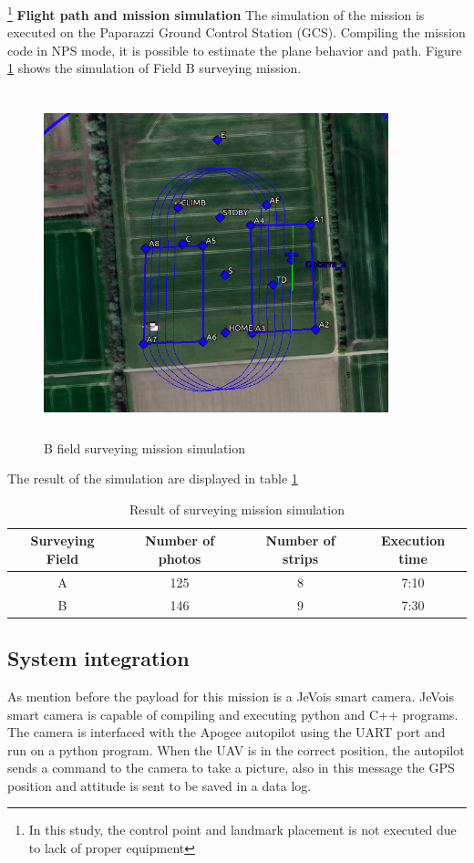 \footnote{In this study, the control point and landmark placement is not executed due to lack of proper equipment} 
\textbf{Flight path and mission simulation}\newline
The simulation of the mission is executed on the Paparazzi Ground Control Station (GCS). Compiling the mission code in NPS mode, it is possible to estimate the plane behavior and path. Figure \ref{fig:bsim} shows the simulation of Field B surveying mission.
\begin{figure}[H]
\centering
\includegraphics[width=10cm,height=10cm,keepaspectratio]{imagenes/SimBField.png}
\caption{B field surveying mission simulation}
\label{fig:bsim}
\end{figure}
The result of the simulation are displayed in table \ref{Table:SimResult}
\begin{table}[H]
\centering
\begin{tabular}{|c|c|c|c|}
\hline
Surveying Field & Number of photos & Number of strips & Execution time \\ \hline
A               & 125              & 8                & 7:10           \\ \hline
B               & 146              & 9                & 7:30           \\ \hline
\end{tabular}
\caption{Result of surveying mission simulation}
\label{Table:SimResult}
\end{table}
\subsection{System integration}
As mention before the payload for this mission is a JeVois smart camera. JeVois smart camera is capable of compiling and executing python and C++ programs. The camera is interfaced with the Apogee autopilot using the UART port and run on a python program.
 When the UAV is in the correct position, the autopilot sends a command to the camera to take a picture, also in this message the GPS position and attitude is sent to be saved in a data log. 

